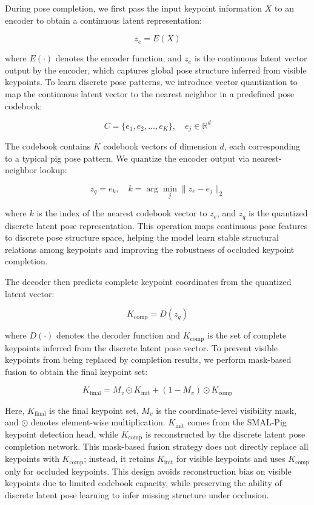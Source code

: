 \documentclass[computers,article,submit,pdftex,moreauthors]{mdpi}
\begin{document}
During pose completion, we first pass the input keypoint information $X$ to an encoder to obtain a continuous latent representation:

\begin{equation}
z_e = E(X)
\end{equation}

where $E(\cdot)$ denotes the encoder function, and $z_e$ is the continuous latent vector output by the encoder, which captures global pose structure inferred from visible keypoints. To learn discrete pose patterns, we introduce vector quantization to map the continuous latent vector to the nearest neighbor in a predefined pose codebook:

\begin{equation}
C = \{e_1, e_2, \ldots, e_K\}, \quad e_j \in \mathbb{R}^d
\end{equation}

The codebook contains $K$ codebook vectors of dimension $d$, each corresponding to a typical pig pose pattern. We quantize the encoder output via nearest-neighbor lookup:

\begin{equation}
z_q = e_k, \quad k = \arg\min_j \|z_e - e_j\|_2
\end{equation}

where $k$ is the index of the nearest codebook vector to $z_e$, and $z_q$ is the quantized discrete latent pose representation. This operation maps continuous pose features to discrete pose structure space, helping the model learn stable structural relations among keypoints and improving the robustness of occluded keypoint completion.

The decoder then predicts complete keypoint coordinates from the quantized latent vector:

\begin{equation}
K_{\text{comp}} = D(z_q)
\end{equation}

where $D(\cdot)$ denotes the decoder function and $K_{\text{comp}}$ is the set of complete keypoints inferred from the discrete latent pose vector. To prevent visible keypoints from being replaced by completion results, we perform mask-based fusion to obtain the final keypoint set:

\begin{equation}
K_{\text{final}} = M_v \odot K_{\text{init}} + (1 - M_v) \odot K_{\text{comp}}
\end{equation}

Here, $K_{\text{final}}$ is the final keypoint set, $M_v$ is the coordinate-level visibility mask, and $\odot$ denotes element-wise multiplication. $K_{\text{init}}$ comes from the SMAL-Pig keypoint detection head, while $K_{\text{comp}}$ is reconstructed by the discrete latent pose completion network. This mask-based fusion strategy does not directly replace all keypoints with $K_{\text{comp}}$; instead, it retains $K_{\text{init}}$ for visible keypoints and uses $K_{\text{comp}}$ only for occluded keypoints. This design avoids reconstruction bias on visible keypoints due to limited codebook capacity, while preserving the ability of discrete latent pose learning to infer missing structure under occlusion.
\end{document}
